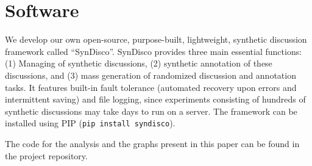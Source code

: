 \section{Software}

We develop our own open-source, purpose-built, lightweight, synthetic discussion framework called “SynDisco”. SynDisco provides three main essential functions: (1) Managing of synthetic discussions, (2) synthetic annotation of these discussions, and (3) mass generation of randomized discussion and annotation tasks. It features built-in fault tolerance (automated recovery upon errors and intermittent saving) and file logging, since experiments consisting of hundreds of synthetic discussions may take days to run on a server. The framework can be installed using PIP (\texttt{pip install  syndisco}).

The code for the analysis and the graphs present in this paper can be found in the project repository\analysislink.